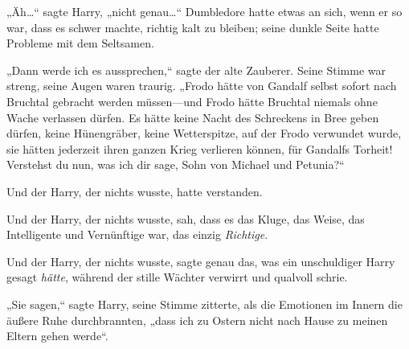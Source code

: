 „Äh…“ sagte Harry, „nicht genau…“ Dumbledore hatte etwas an sich, wenn er so war, dass es schwer machte, richtig kalt zu bleiben; seine dunkle Seite hatte Probleme mit dem Seltsamen.

„Dann werde ich es aussprechen,“ sagte der alte Zauberer. Seine Stimme war streng, seine Augen waren traurig. „Frodo hätte von Gandalf selbst sofort nach Bruchtal gebracht werden müssen—und Frodo hätte Bruchtal niemals ohne Wache verlassen dürfen. Es hätte keine Nacht des Schreckens in Bree geben dürfen, keine Hünengräber, keine Wetterspitze, auf der Frodo verwundet wurde, sie hätten jederzeit ihren ganzen Krieg verlieren können, für Gandalfs Torheit! Verstehst du nun, was ich dir sage, Sohn von Michael und Petunia?“

Und der Harry, der nichts wusste, hatte verstanden.

Und der Harry, der nichts wusste, sah, dass es das Kluge, das Weise, das Intelligente und Vernünftige war, das einzig \emph{Richtige}.

Und der Harry, der nichts wusste, sagte genau das, was ein unschuldiger Harry gesagt \emph{hätte}, während der stille Wächter verwirrt und qualvoll schrie.

„Sie sagen,“ sagte Harry, seine Stimme zitterte, als die Emotionen im Innern die äußere Ruhe durchbrannten, „dass ich zu Ostern nicht nach Hause zu meinen Eltern gehen werde“.

